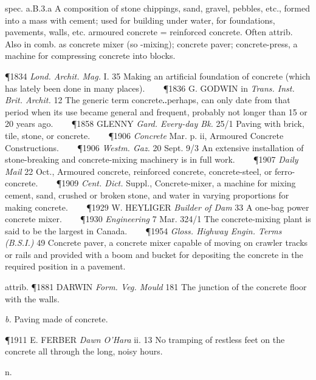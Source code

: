 \begin{description}[wide, labelwidth=!, labelindent=0pt]
\begin{myenumerate}
 spec. a.B.3.a A composition of stone chippings, sand, gravel, pebbles, etc., formed into a mass with cement; used for building under water, for foundations, pavements, walls, etc. armoured concrete = reinforced concrete. Often attrib. Also in comb. as concrete mixer (so -mixing); concrete paver; concrete-press, a machine for compressing concrete into blocks.

\P 1834  \textit{Lond. Archit. Mag.} I. 35 Making an artificial foundation of concrete (which has lately been done in many places).    
\P 1836 G. GODWIN in  \textit{Trans. Inst. Brit. Archit.} 12 The generic term concrete‥perhaps, can only date from that period when its use became general and frequent, probably not longer than 15 or 20 years ago.    
\P 1858 GLENNY  \textit{Gard. Every-day Bk.} 25/1 Paving with brick, tile, stone, or concrete.    
\P 1906 \textit{Concrete}  Mar. p. ii, Armoured Concrete Constructions.    
\P 1906 \textit{Westm.  Gaz.} 20 Sept. 9/3 An extensive installation of stone-breaking and concrete-mixing machinery is in full work.    
\P 1907  \textit{Daily Mail} 22 Oct., Armoured concrete, reinforced concrete, concrete-steel, or ferro-concrete.    
\P 1909 \textit{Cent.  Dict.} Suppl., Concrete-mixer, a machine for mixing cement, sand, crushed or broken stone, and water in varying proportions for making concrete.    
\P 1929 W. HEYLIGER  \textit{Builder of Dam} 33 A one-bag power concrete mixer.    
\P 1930 \textit{Engineering}  7 Mar. 324/1 The concrete-mixing plant is said to be the largest in Canada.    
\P 1954 \textit{Gloss.  Highway Engin. Terms (B.S.I.)} 49 Concrete paver, a concrete mixer capable of moving on crawler tracks or rails and provided with a boom and bucket for depositing the concrete in the required position in a pavement.

attrib. \P 1881 DARWIN  \textit{Form. Veg. Mould} 181 The junction of the concrete floor with the walls.

\textit{b.} Paving made of concrete.

\P 1911 E. FERBER  \textit{Dawn O'Hara} ii. 13 No tramping of restless feet on the concrete all through the long, noisy hours.
\end{myenumerate}


 n.

\noindent {}

\vspace{-0.3cm}


\end{description}
